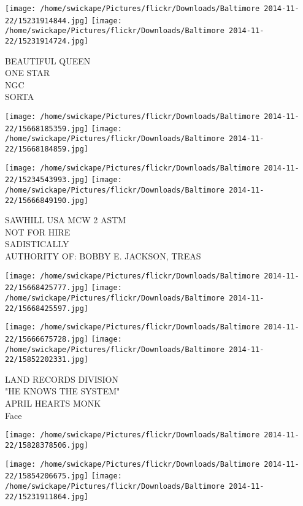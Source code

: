\documentclass[10pt,letterpaper]{article}
\begin{document}
\texttt{[image: /home/swickape/Pictures/flickr/Downloads/Baltimore 2014-11-22/15231914844.jpg]}
\texttt{[image: /home/swickape/Pictures/flickr/Downloads/Baltimore 2014-11-22/15231914724.jpg]}

BEAUTIFUL QUEEN\\
ONE STAR\\
NGC\\
SORTA\\
\pagebreak

\texttt{[image: /home/swickape/Pictures/flickr/Downloads/Baltimore 2014-11-22/15668185359.jpg]}
\texttt{[image: /home/swickape/Pictures/flickr/Downloads/Baltimore 2014-11-22/15668184859.jpg]}

\texttt{[image: /home/swickape/Pictures/flickr/Downloads/Baltimore 2014-11-22/15234543993.jpg]}
\texttt{[image: /home/swickape/Pictures/flickr/Downloads/Baltimore 2014-11-22/15666849190.jpg]}

SAWHILL USA MCW 2 ASTM\\
NOT FOR HIRE\\
SADISTICALLY\\
AUTHORITY OF: BOBBY E. JACKSON, TREAS\\
\pagebreak

\texttt{[image: /home/swickape/Pictures/flickr/Downloads/Baltimore 2014-11-22/15668425777.jpg]}
\texttt{[image: /home/swickape/Pictures/flickr/Downloads/Baltimore 2014-11-22/15668425597.jpg]}

\texttt{[image: /home/swickape/Pictures/flickr/Downloads/Baltimore 2014-11-22/15666675728.jpg]}
\texttt{[image: /home/swickape/Pictures/flickr/Downloads/Baltimore 2014-11-22/15852202331.jpg]}

LAND RECORDS DIVISION\\
"HE KNOWS THE SYSTEM"\\
APRIL HEARTS MONK\\
Face\\
\pagebreak

\texttt{[image: /home/swickape/Pictures/flickr/Downloads/Baltimore 2014-11-22/15828378506.jpg]}

\vspace{0.25in}
\texttt{[image: /home/swickape/Pictures/flickr/Downloads/Baltimore 2014-11-22/15854206675.jpg]}
\texttt{[image: /home/swickape/Pictures/flickr/Downloads/Baltimore 2014-11-22/15231911864.jpg]}
\end{document}
